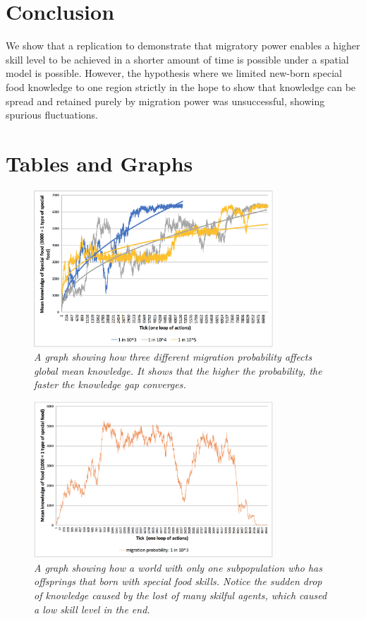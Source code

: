 \documentclass[a4paper,12pt]{article}
\begin{document}
\section{Conclusion}
We show that a replication to demonstrate that migratory power enables a higher skill level to be achieved in a shorter amount of time is possible under a spatial model is possible. However, the hypothesis where we limited new-born special food knowledge to one region strictly in the hope to show that knowledge can be spread and retained purely by migration power was unsuccessful, showing spurious fluctuations. 


\newpage
\appendix
\section{Tables and Graphs}

\begin{figure}[h]
    \centering
    \includegraphics[width=0.8\textwidth]{replicate}
    \caption{\textit{A graph showing how three different migration probability affects global mean knowledge. It shows that the higher the probability, the faster the knowledge gap converges.}}
    \label{fig:replicate}
\end{figure}

\begin{figure}[h]
    \centering
    \includegraphics[width=0.8\textwidth]{test}
    \caption{\textit{A graph showing how a world with only one subpopulation who has offsprings that born with special food skills. Notice the sudden drop of knowledge caused by the lost of many skilful agents, which caused a low skill level in the end.}}
    \label{fig:test}
\end{figure}
\end{document}

